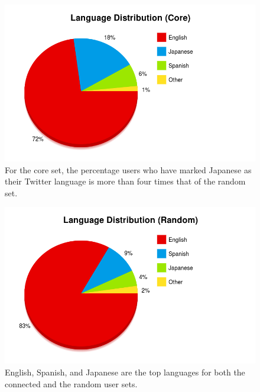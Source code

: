 \begin{figure}[h]
 \centering
 \includegraphics[bb=0 0 800 500,scale=.2]{./images/lang-core.png}
 \caption{For the core set, the percentage users who have marked Japanese as their Twitter language is more than four times that of the random set.}
\label{fig:lang-core}
\end{figure}

\begin{figure}[h]
 \centering
 \includegraphics[bb=0 0 800 500,scale=.2]{./images/lang-rand.png}
 \caption{English, Spanish, and Japanese are the top languages for both the connected and the random user sets.}
\label{fig:lang-rand}
\end{figure}

